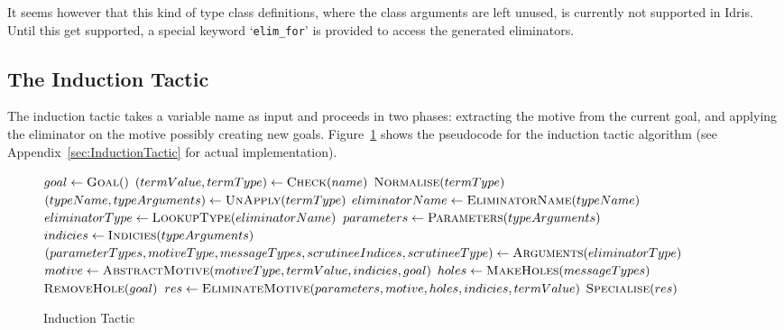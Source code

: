 \documentclass[a4paper]{article}%
\begin{document}
It seems however that this kind of type class definitions, where the class arguments are left unused, is currently not supported in Idris. Until this get supported, a special keyword `\texttt{elim\_for}' is provided to access the generated eliminators.


\subsection{The Induction Tactic}
\label{sub:TheInductionTactic}
The induction tactic takes a variable name as input and proceeds in two phases: extracting the motive from the current goal, and applying the eliminator on the motive possibly creating new goals. Figure~\ref{fig:indtac} shows
the pseudocode for the induction tactic algorithm (see Appendix~\ref{sec:InductionTactic} for actual implementation).

\begin{figure}[H]
  \begin{center}
    \begin{algorithmic}[1]
    \State $goal \gets \Call{Goal}{\null}$
    \State $\left(termValue, termType\right) \gets \Call{Check}{name}$
    \State $\Call{Normalise}{termType}$
    \State $\left(typeName, typeArguments\right) \gets \Call{UnApply}{termType}$
    \State $eliminatorName \gets \Call{EliminatorName}{typeName}$
    \State $eliminatorType \gets \Call{LookupType}{eliminatorName}$
    \State $parameters \gets \Call{Parameters}{typeArguments}$
    \State $indicies \gets \Call{Indicies}{typeArguments}$
    \State $\left(parameterTypes, motiveType, messageTypes, scrutineeIndices, scrutineeType\right) \gets \Call{Arguments}{eliminatorType}$
    \State $motive \gets \Call{AbstractMotive}{motiveType, termValue, indicies, goal}$
    \State $holes \gets \Call{MakeHoles}{messageTypes}$
    \State $\Call{RemoveHole}{goal}$
    \State $res \gets \Call{EliminateMotive}{parameters, motive, holes, indicies, termValue}$
    \State \Return $\Call{Specialise}{res}$
    \EndProcedure
  \end{algorithmic}
  \end{center}
\caption{Induction Tactic}
\label{fig:indtac}
\end{figure}
\end{document}
